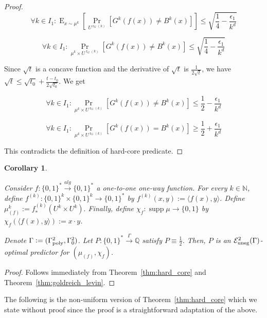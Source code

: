 \documentclass{article}
\numberwithin{equation}{section}
\theoremstyle{definition}
\theoremstyle{plain}
\newtheorem{corollary}{Corollary}[section]
\newcommand{\Words}{{\{ 0, 1 \}^*}}
\newcommand{\WordsLen}[1]{{\{ 0, 1 \}^{#1}}}
\newcommand{\Bool}{\{0,1\}}
\DeclareMathOperator{\Supp}{supp}
\DeclareMathOperator{\Prb}{Pr}
\DeclareMathOperator{\E}{E}
\DeclareMathOperator{\R}{r}
\newcommand{\Nats}{\mathbb{N}}
\newcommand{\Rats}{\mathbb{Q}}
\newcommand{\Chev}[1]{\langle #1 \rangle}
\begin{document}
\begin{proof}
$$ \forall k \in I_1: \E_{x \sim \mu^k}[\Prb_{U^{\R_G(k)}}[G^k(f(x)) \ne B^k(x)]] \leq \sqrt{\frac{1}{4} - \frac{\epsilon_1}{k^d}} $$

$$ \forall k \in I_1: \Prb_{\mu^k \times U^{\R_G(k)}}[G^k(f(x)) \ne B^k(x)] \leq \sqrt{\frac{1}{4} - \frac{\epsilon_1}{k^d}} $$

Since $\sqrt{t}$ is a concave function and the derivative of $\sqrt{t}$ is $\frac{1}{2\sqrt{t}}$, we have $\sqrt{t} \leq \sqrt{t_0} + \frac{t-t_0}{2\sqrt{t_0}}$. We get

$$ \forall k \in I_1: \Prb_{\mu^k \times U^{\R_G(k)}}[G^k(f(x)) \ne B^k(x)] \leq \frac{1}{2}-\frac{\epsilon_1}{k^d}$$

$$ \forall k \in I_1: \Prb_{\mu^k \times U^{\R_G(k)}}[G^k(f(x)) = B^k(x)] \geq \frac{1}{2}+\frac{\epsilon_1}{k^d}$$

This contradicts the definition of hard-core predicate.

\end{proof}

\begin{corollary}
\label{thm:one_way}

Consider $f: \Words \xrightarrow{alg} \Words$ a one-to-one one-way function. For every $k \in \Nats$, define $f^{(k)}: \WordsLen{k} \times \WordsLen{k} \rightarrow \Words$ by ${f^{(k)}(x,y):=\Chev{f(x),y}}$. Define $\mu_{(f)}^k:=f_*^{(k)}(U^k \times U^k).$ Finally, define $\chi_f: \Supp \mu \rightarrow \Bool$ by ${\chi_f(\Chev{f(x),y}):=x \cdot y}$.

Denote $\Gamma:=(\Gamma_{\textnormal{poly}}^2,\Gamma_0^2)$. Let $P: \Words \xrightarrow{\Gamma} \Rats$ satisfy $P \equiv \frac{1}{2}$. Then, $P$ is an $\mathcal{E}_{\textnormal{uneg}}^2(\Gamma)$-optimal predictor for $(\mu_{(f)}, \chi_f)$.

\end{corollary}

\begin{proof}

Follows immediately from Theorem~\ref{thm:hard_core} and Theorem~\ref{thm:goldreich_levin}.

\end{proof}

The following is the non-uniform version of Theorem~\ref{thm:hard_core} which we state without proof since the proof is a straightforward adaptation of the above.
\end{document}
